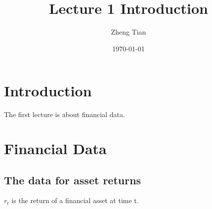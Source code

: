 \documentclass[11pt]{article}
\author{Zheng Tian}
\date{\today}
\title{Lecture 1 Introduction}
\begin{document}
\maketitle
\setcounter{tocdepth}{1}
\tableofcontents



\section{Introduction}
\label{sec:orgf5b8070}


The first lecture is about financial data.

\section{Financial Data}
\label{sec:orga2dc122}

\subsection{The data for asset returns}
\label{sec:org604860b}

\(r_t\) is the return of a financial asset at time t.
\end{document}
